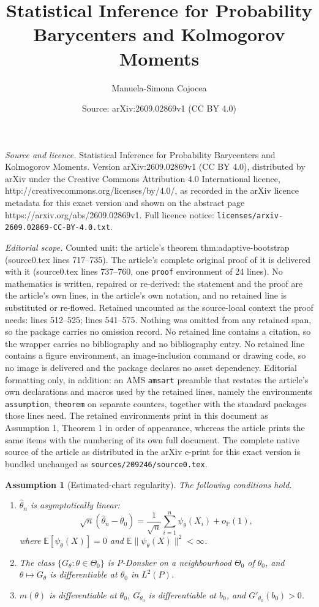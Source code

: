 \documentclass[10pt,a4paper]{amsart}
\title{Statistical Inference for Probability Barycenters and Kolmogorov Moments}
\author{Manuela-Simona Cojocea}
\date{Source: arXiv:2609.02869v1 (CC BY 4.0)}
\newtheorem{assumption}{Assumption}
\newcommand{\E}{\mathbb{E}}
\newcommand{\Prob}{\mathbb{P}}
\begin{document}
\maketitle

\noindent\emph{Source and licence.} Statistical Inference for Probability Barycenters and Kolmogorov Moments. Version arXiv:2609.02869v1 (CC BY 4.0), distributed by arXiv under the Creative Commons Attribution 4.0 International licence, http://creativecommons.org/licenses/by/4.0/, as recorded in the arXiv licence metadata for this exact version and shown on the abstract page https://arxiv.org/abs/2609.02869v1. Full licence notice: \texttt{licenses/arxiv-2609.02869-CC-BY-4.0.txt}.\par\smallskip

\noindent\textit{Editorial scope.} Counted unit: the article's theorem thm:adaptive-bootstrap (source0.tex lines 717--735). The article's complete original proof of it is delivered with it (source0.tex lines 737--760, one \texttt{proof} environment of 24 lines). No mathematics is written, repaired or re-derived: the statement and the proof are the article's own lines, in the article's own notation, and no retained line is substituted or re-flowed.  Retained uncounted as the source-local context the proof needs: lines 512--525; lines 541--575.  Nothing was omitted from any retained span, so the package carries no omission record.  No retained line contains a citation, so the wrapper carries no bibliography and no bibliography entry.  No retained line contains a figure environment, an image-inclusion command or drawing code, so no image is delivered and the package declares no asset dependency.  Editorial formatting only, in addition: an AMS \texttt{amsart} preamble that restates the article's own declarations and macros used by the retained lines, namely the environments \texttt{assumption}, \texttt{theorem} on separate counters, together with the standard packages those lines need.  The retained environments print in this document as Assumption 1, Theorem 1 in order of appearance, whereas the article prints the same items with the numbering of its own full document.  The complete native source of the article as distributed in the arXiv e-print for this exact version is bundled unchanged as \texttt{sources/209246/source0.tex}.
\begin{assumption}[Estimated-chart regularity]\label{ass:adaptive}
The following conditions hold.
\begin{enumerate}[label=(\roman*)]
\item $\widehat\theta_n$ is asymptotically linear:
\[
\sqrt n(\widehat\theta_n-\theta_0)
=
\frac1{\sqrt n}\sum_{i=1}^n\psi_\theta(X_i)+o_{\Prob}(1),
\]
where $\E[\psi_\theta(X)]=0$ and $\E\|\psi_\theta(X)\|^2<\infty$.
\item The class $\{G_\theta:\theta\in\Theta_0\}$ is $P$-Donsker on a neighbourhood $\Theta_0$ of $\theta_0$, and $\theta\mapsto G_\theta$ is differentiable at $\theta_0$ in $L^2(P)$.
\item $m(\theta)$ is differentiable at $\theta_0$, $G_{\theta_0}$ is differentiable at $b_0$, and $G'_{\theta_0}(b_0)>0$.
\end{enumerate}
\end{assumption}
\end{document}
